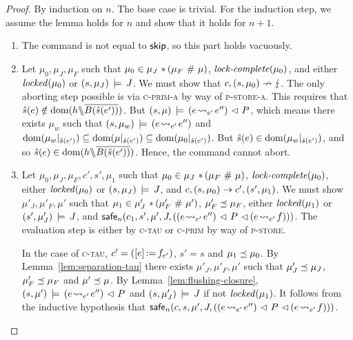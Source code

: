 \documentclass[11pt]{report}         %
\begin{document}
\begin{proof}
    By induction on $n$. The base case is trivial. For the induction step, we assume the lemma holds for $n$ and show that it holds for $n+1$.

    \begin{enumerate}
        \item The command is not equal to $\operatorname{\mathsf{skip}}$, so this part holds vacuously. 

        \item Let $\mu_0,\mu_J,\mu_F$ such that $\mu_0 \in \mu_J \operatorname{\,\ast\,} (\mu_F \operatorname{\,\#\,} \mu)$, $\text{\textit{lock-complete}}(\mu_0)$, and either $\mathit{locked}(\mu_0)$ or $(s,\mu_J) \,\models\, J$. We must show that $c,(s,\mu_0) \nrightarrow \lightning$. The only aborting step possible is via \textsc{c-prim-a} by way of \textsc{p-store-a}. This requires that $\hat{s}(e) \notin \operatorname{\mathrm{dom}}(h \backslash\!\!\backslash \overline{B(\hat{s}(e'))})$. But $(s,\mu) \,\models\, (e \!\leadsto_{e'}\! e'') \operatorname{\,\vartriangleleft\,} P$, which means there exists $\mu_w$ such that $(s,\mu_w) \,\models\, (e \!\leadsto_{e'}\! e'')$ and $\operatorname{\mathrm{dom}}(\mu_w |_{\hat{s}(e')}) \subseteq \operatorname{\mathrm{dom}}(\mu |_{\hat{s}(e')}) \subseteq \operatorname{\mathrm{dom}}(\mu_0 |_{\hat{s}(e')})$. But $\hat{s}(e) \in \operatorname{\mathrm{dom}}(\mu_w |_{\hat{s}(e')})$, and so $\hat{s}(e) \in \operatorname{\mathrm{dom}}(h \backslash\!\!\backslash \overline{B(\hat{s}(e'))})$. Hence, the command cannot abort.

        \item Let $\mu_0,\mu_J,\mu_F,c',s',\mu_1$ such that $\mu_0 \in \mu_J \operatorname{\,\ast\,} (\mu_F \operatorname{\,\#\,} \mu)$, $\text{\textit{lock-complete}}(\mu_0)$, either $\mathit{locked}(\mu_0)$ or $(s,\mu_J) \,\models\, J$, and $c,(s,\mu_0) \rightarrow c',(s',\mu_1)$. We must show $\mu'_J,\mu'_F,\mu'$ such that $\mu_1 \in \mu'_J \operatorname{\,\ast\,} (\mu'_F \operatorname{\,\#\,} \mu')$, $\mu'_F \preceq \mu_F$, either $\mathit{locked}(\mu_1)$ or $(s',\mu'_J) \,\models\, J$, and $\mathsf{safe}_{n}(c_1,s',\mu',J,\left((e \!\leadsto_{e'}\! e'') \operatorname{\,\vartriangleleft\,} P \operatorname{\,\vartriangleleft\,} (e \!\leadsto_{e'}\! f)\right))$. The evaluation step is either by \textsc{c-tau} or \textsc{c-prim} by way of \textsc{p-store}. 

        In the case of \textsc{c-tau}, $c' = (\left[ e \right] \operatorname{:\!=} f_{e'})$, $s' = s$ and $\mu_1 \preceq \mu_0$. By Lemma~\ref{lem:separation-tau} there exists $\mu'_J,\mu'_F,\mu'$ such that $\mu'_J \preceq \mu_J$, $\mu'_F \preceq \mu_F$ and $\mu' \preceq \mu$. By Lemma~\ref{lem:flushing-closure}, $(s,\mu') \,\models\, (e \!\leadsto_{e'}\! e'') \operatorname{\,\vartriangleleft\,} P$ and $(s,\mu'_J) \,\models\, J$ if not $\mathit{locked}(\mu_1)$. It follows from the inductive hypothesis that $\mathsf{safe}_{n}(c,s,\mu',J,((e \!\leadsto_{e'}\! e'') \operatorname{\,\vartriangleleft\,} P \operatorname{\,\vartriangleleft\,} (e \!\leadsto_{e'}\! f)))$. 


\end{enumerate}
\end{proof}
\end{document}
